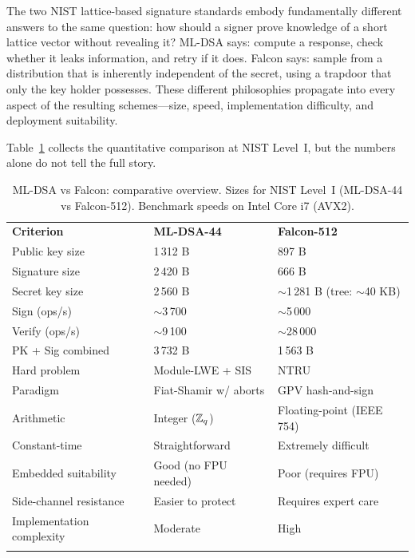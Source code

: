 The two NIST lattice-based signature standards embody fundamentally different answers to the same question: how should a signer prove knowledge of a short lattice vector without revealing it?  ML-DSA says: compute a response, check whether it leaks information, and retry if it does.  Falcon says: sample from a distribution that is inherently independent of the secret, using a trapdoor that only the key holder possesses.  These different philosophies propagate into every aspect of the resulting schemes---size, speed, implementation difficulty, and deployment suitability.

Table~\ref{tab:sig-comparison} collects the quantitative comparison at NIST Level~I, but the numbers alone do not tell the full story.

\begin{table}[t]
\caption{ML-DSA vs Falcon: comparative overview.  Sizes for NIST Level~I (ML-DSA-44 vs Falcon-512).  Benchmark speeds on Intel Core i7 (AVX2).}
\label{tab:sig-comparison}
\begin{tabular}{p{3.8cm}p{4cm}p{4cm}}
\hline\noalign{\smallskip}
\textbf{Criterion} & \textbf{ML-DSA-44} & \textbf{Falcon-512} \\
\noalign{\smallskip}\svhline\noalign{\smallskip}
Public key size        & 1\,312 B             & 897 B \\
Signature size         & 2\,420 B             & 666 B \\
Secret key size        & 2\,560 B             & $\sim$1\,281 B (tree: $\sim$40 KB) \\
Sign (ops/s)           & $\sim$3\,700         & $\sim$5\,000 \\
Verify (ops/s)         & $\sim$9\,100         & $\sim$28\,000 \\
PK + Sig combined      & 3\,732 B             & 1\,563 B \\
\noalign{\smallskip}\hline
Hard problem           & Module-LWE + SIS     & NTRU \\
Paradigm               & Fiat-Shamir w/ aborts & GPV hash-and-sign \\
Arithmetic             & Integer ($\mathbb{Z}_q$)     & Floating-point (IEEE 754) \\
Constant-time          & Straightforward      & Extremely difficult \\
Embedded suitability   & Good (no FPU needed) & Poor (requires FPU) \\
Side-channel resistance & Easier to protect   & Requires expert care \\
Implementation complexity & Moderate           & High \\
\noalign{\smallskip}\hline
\end{tabular}
\end{table}

